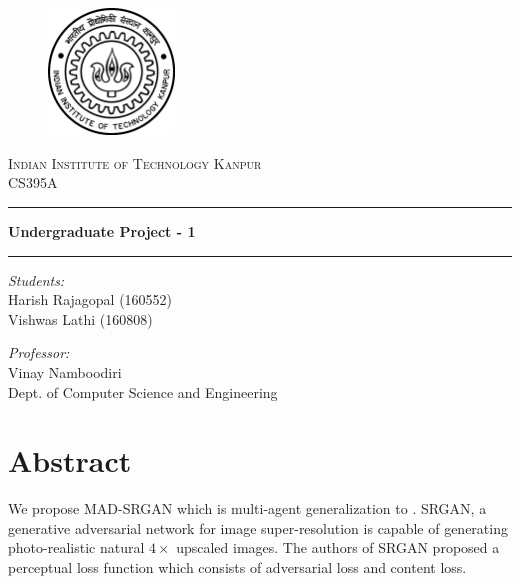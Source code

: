 \documentclass[12pt,a4paper,twocolumn]{article}
\begin{document}
    \begin{titlepage}
        \centering

        \vspace*{2cm}
        \begin{figure}[h]
            \centering
            \includegraphics[width=0.3\textwidth]{iitk-logo.png}\\[15mm]
        \end{figure}
        \textsc{\LARGE Indian Institute of Technology Kanpur}\\[1cm]
        {\Large CS395A}\\[7mm]

        \hrule
        \vspace{3mm}
        \textbf{\Large Undergraduate Project - 1}\\[5mm]
        \hrule
        \vspace{3mm}

        \begin{multicols}{2}
            \textit{Students:}\\[2mm]
            Harish Rajagopal (160552)\\
            Vishwas Lathi (160808)\\

            \vfill\null\columnbreak

            \textit{Professor:}\\[2mm]
            Vinay Namboodiri\\
            Dept. of Computer Science and Engineering
        \end{multicols}
    \end{titlepage}


    \section{Abstract}
        We propose MAD-SRGAN which is multi-agent generalization to \cite{SRGAN}.
        SRGAN, a generative adversarial network for image super-resolution is capable of generating photo-realistic natural $4\times$ upscaled images.
        The authors of SRGAN proposed a perceptual loss function which consists of adversarial loss and content loss.
\end{document}
